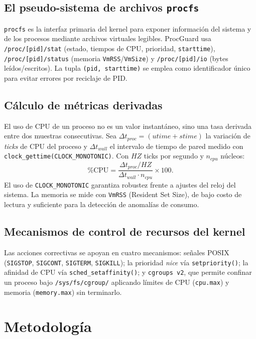 \documentclass[conference]{IEEEtran}
\begin{document}
\subsection{El pseudo-sistema de archivos \texttt{procfs}}
\texttt{procfs} es la interfaz primaria del kernel para exponer información del
sistema y de los procesos mediante archivos virtuales legibles. ProcGuard usa
\texttt{/proc/[pid]/stat} (estado, tiempos de CPU, prioridad, \texttt{starttime}),
\texttt{/proc/[pid]/status} (memoria \texttt{VmRSS}/\texttt{VmSize}) y
\texttt{/proc/[pid]/io} (bytes leídos/escritos). La tupla
\texttt{(pid, starttime)} se emplea como identificador único para evitar errores
por reciclaje de PID.

\subsection{Cálculo de métricas derivadas}
El uso de CPU de un proceso no es un valor instantáneo, sino una tasa derivada
entre dos muestras consecutivas. Sea $\Delta t_{proc} = (utime+stime)$ la
variación de \emph{ticks} de CPU del proceso y $\Delta t_{wall}$ el intervalo de
tiempo de pared medido con \texttt{clock\_gettime(CLOCK\_MONOTONIC)}. Con $\mathit{HZ}$
ticks por segundo y $n_{cpu}$ núcleos:
\begin{equation}
\%\mathrm{CPU} = \frac{\Delta t_{proc} / \mathit{HZ}}{\Delta t_{wall}\cdot n_{cpu}}\times 100.
\end{equation}
El uso de \texttt{CLOCK\_MONOTONIC} garantiza robustez frente a ajustes del reloj
del sistema. La memoria se mide con \texttt{VmRSS} (Resident Set Size), de bajo
costo de lectura y suficiente para la detección de anomalías de consumo.

\subsection{Mecanismos de control de recursos del kernel}
Las acciones correctivas se apoyan en cuatro mecanismos: señales POSIX
(\texttt{SIGSTOP}, \texttt{SIGCONT}, \texttt{SIGTERM}, \texttt{SIGKILL}); la
prioridad \emph{nice} vía \texttt{setpriority()}; la afinidad de CPU vía
\texttt{sched\_setaffinity()}; y \texttt{cgroups~v2}, que permite confinar un
proceso bajo \texttt{/sys/fs/cgroup/} aplicando límites de CPU (\texttt{cpu.max})
y memoria (\texttt{memory.max}) sin terminarlo.

\section{Metodología}
\end{document}
